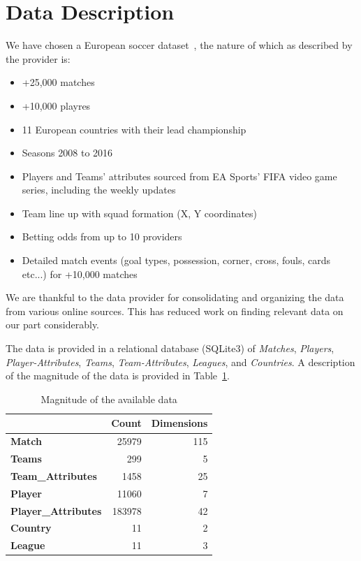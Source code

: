 \documentclass[11pt]{article}
\begin{document}
\section{Data Description}
\label{sec:data-desc}
We have chosen a European soccer dataset~\cite{mathien1}, the nature of which as described by the provider is:
\begin{itemize}
  \setlength\itemsep{0em}
  \item{+25,000 matches}
  \item{+10,000 playres}
  \item{11 European countries with their lead championship}
  \item{Seasons 2008 to 2016}
  \item{Players and Teams' attributes sourced from EA Sports' FIFA video game series, including the weekly updates}
  \item{Team line up with squad formation (X, Y coordinates)}
  \item{Betting odds from up to 10 providers}
  \item{Detailed match events (goal types, possession, corner, cross, fouls, cards etc...) for +10,000 matches}
\end{itemize}
We are thankful to the data provider for consolidating and organizing the data from various online sources.
This has reduced work on finding relevant data on our part considerably.

The data is provided in a relational database (SQLite3) of \textit{Matches}, \textit{Players}, \textit{Player-Attributes}, \textit{Teams}, \textit{Team-Attributes}, \textit{Leagues}, and \textit{Countries}.
A description of the magnitude of the data is provided in Table~\ref{tab:data-desc}.

\begin{table}[ht]
\centering
\begin{tabular}{|l|r|r|}
\hline
\textbf{}                   & \textbf{Count} & \textbf{Dimensions} \\ \hline
\textbf{Match}              & 25979          & 115                 \\ \hline
\textbf{Teams}              & 299            & 5                   \\ \hline
\textbf{Team\_Attributes}   & 1458           & 25                  \\ \hline
\textbf{Player}             & 11060          & 7                   \\ \hline
\textbf{Player\_Attributes} & 183978         & 42                  \\ \hline
\textbf{Country}            & 11             & 2                   \\ \hline
\textbf{League}             & 11             & 3                   \\ \hline
\end{tabular}
\caption{Magnitude of the available data}
\label{tab:data-desc}
\end{table}
\end{document}
